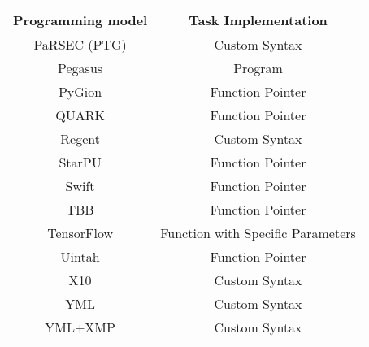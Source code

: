 \begin{tabular}{cc}
\hline
Programming model & Task Implementation \\
\hline
PaRSEC (PTG) & Custom Syntax\\
Pegasus & Program\\
PyGion & Function Pointer\\
QUARK & Function Pointer\\
Regent & Custom Syntax\\
StarPU & Function Pointer\\
Swift & Function Pointer\\
TBB & Function Pointer\\
TensorFlow & Function with Specific Parameters\\
Uintah & Function Pointer\\
X10 & Custom Syntax\\
YML & Custom Syntax\\
YML+XMP & Custom Syntax\\
\hline
\end{tabular}
